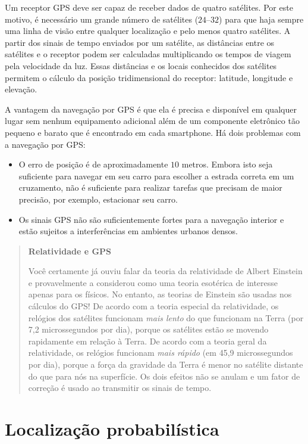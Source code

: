 Um receptor GPS deve ser capaz de receber dados de quatro satélites. Por este motivo, é necessário um grande número de satélites ($24$--$32$) para que haja sempre uma linha de visão entre qualquer localização e pelo menos quatro satélites. A partir dos sinais de tempo enviados por um satélite, as distâncias entre os satélites e o receptor podem ser calculadas multiplicando os tempos de viagem pela velocidade da luz. Essas distâncias e os locais conhecidos dos satélites permitem o cálculo da posição tridimensional do receptor: latitude, longitude e elevação.

A vantagem da navegação por GPS é que ela é precisa e disponível em qualquer lugar sem nenhum equipamento adicional além de um componente eletrônico tão pequeno e barato que é encontrado em cada smartphone. Há dois problemas com a navegação por GPS:
\begin{itemize}
\item O erro de posição é de aproximadamente $10$ metros. Embora isto seja suficiente para navegar em seu carro para escolher a estrada correta em um cruzamento, não é suficiente para realizar tarefas que precisam de maior precisão, por exemplo, estacionar seu carro.
\item Os sinais GPS não são suficientemente fortes para a navegação interior e estão sujeitos a interferências em ambientes urbanos densos.
\end{itemize}

\begin{quote}
\begin{center}
\textbf{Relatividade e GPS}
\end{center}
Você certamente já ouviu falar da teoria da relatividade de Albert Einstein e provavelmente a considerou como uma teoria esotérica de interesse apenas para os físicos. No entanto, as teorias de Einstein são usadas nos cálculos do GPS! De acordo com a teoria especial da relatividade, os relógios dos satélites funcionam \emph{mais lento} do que funcionam na Terra (por 7,2 microssegundos por dia), porque os satélites estão se movendo rapidamente em relação à Terra. De acordo com a teoria geral da relatividade, os relógios funcionam \emph{mais rápido} (em 45,9 microssegundos por dia), porque a força da gravidade da Terra é menor no satélite distante do que para nós na superfície. Os dois efeitos não se anulam e um fator de correção é usado ao transmitir os sinais de tempo.
\end{quote}

\section{Localização probabilística}\label{s.prob-local}

